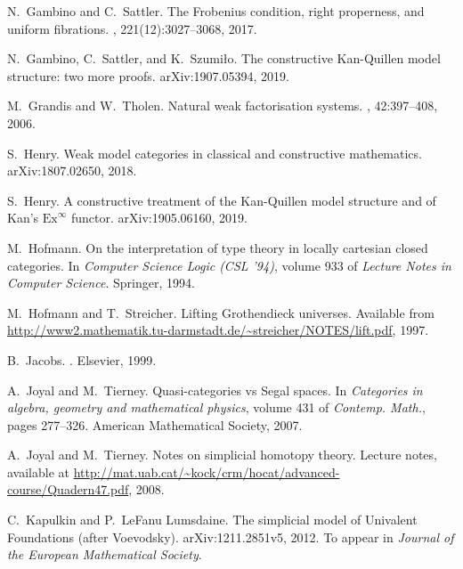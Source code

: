 \documentclass[reqno,10pt,a4paper,oneside,draft]{amsart}
\numberwithin{equation}{section}
\theoremstyle{mythm}
\theoremstyle{mydef}
\theoremstyle{myrmk}
\begin{document}
\begin{thebibliography}{{}dBM15}
N.~Gambino and C.~Sattler.
\newblock The {F}robenius condition, right properness, and uniform fibrations.
, 221(12):3027--3068, 2017.

N.~Gambino, C.~Sattler, and K.~Szumi{\l}o.
\newblock The constructive {K}an-{Q}uillen model structure: two more proofs.
\newblock arXiv:1907.05394, 2019.

M.~Grandis and W.~Tholen.
\newblock Natural weak factorisation systems.
, 42:397--408, 2006.

S.~Henry.
\newblock Weak model categories in classical and constructive mathematics.
\newblock arXiv:1807.02650, 2018.

S.~Henry.
\newblock A constructive treatment of the {K}an-{Q}uillen model structure and
  of {K}an's $\mathrm{Ex}^\infty$ functor.
\newblock arXiv:1905.06160, 2019.

M.~Hofmann.
\newblock On the interpretation of type theory in locally cartesian closed
  categories.
\newblock In {\em Computer Science Logic (CSL '94)}, volume 933 of {\em Lecture
  Notes in Computer Science}. Springer, 1994.

M.~Hofmann and T.~Streicher.
\newblock Lifting {G}rothendieck universes.
\newblock Available from \url{http://www2.mathematik.tu-darmstadt.de/~streicher/NOTES/lift.pdf}, 1997.

B.~Jacobs.
.
\newblock Elsevier, 1999.

A.~Joyal and M.~Tierney.
\newblock Quasi-categories vs {S}egal spaces.
\newblock In {\em Categories in algebra, geometry and mathematical physics},
  volume 431 of {\em Contemp. Math.}, pages 277--326. American Mathematical
  Society, 2007.

A.~Joyal and M.~Tierney.
\newblock Notes on simplicial homotopy theory.
\newblock Lecture notes, available at
  \url{http://mat.uab.cat/~kock/crm/hocat/advanced-course/Quadern47.pdf}, 2008.

C.~Kapulkin and P.~LeFanu Lumsdaine.
\newblock The simplicial model of {U}nivalent {F}oundations (after
  {V}oevodsky).
\newblock arXiv:1211.2851v5, 2012.
\newblock To appear in \emph{Journal of the European Mathematical Society}.


\end{thebibliography}
\end{document}
